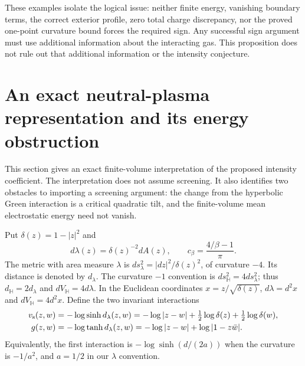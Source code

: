 \documentclass[11pt,a4paper]{article}
\numberwithin{equation}{section}
\theoremstyle{definition}
\theoremstyle{remark}
\begin{document}
These examples isolate the logical issue: neither finite energy,
vanishing boundary terms, the correct exterior profile, zero total
charge discrepancy, nor the proved one-point curvature bound forces
the required sign.  Any successful sign argument must use additional
information about the interacting gas.  This proposition does not
rule out that additional information or the intensity conjecture.


\section{An exact neutral-plasma representation and its energy obstruction}
\label{sec:neutral-ocp-screening}

This section gives an exact finite-volume interpretation of the proposed
intensity coefficient.  The interpretation does not assume screening.
It also identifies two obstacles to importing a screening argument: the
change from the hyperbolic Green interaction is a critical quadratic
tilt, and the finite-volume mean electrostatic energy need not vanish.

Put $\delta(z)=1-|z|^2$ and
\[
 d\lambda(z)=\delta(z)^{-2}dA(z),\qquad
 c_\beta=\frac{4/\beta-1}{\pi}.
\]
The metric with area measure $\lambda$ is
$ds_\lambda^2=|dz|^2/\delta(z)^2$, of curvature $-4$.
Its distance is denoted by $d_\lambda$.
The curvature $-1$ convention is $ds_{\mathbb H}^2=4ds_\lambda^2$;
thus $d_{\mathbb H}=2d_\lambda$ and $dV_{\mathbb H}=4d\lambda$.
In the Euclidean coordinates $x=z/\sqrt{\delta(z)}$,
$d\lambda=d^2x$ and $dV_{\mathbb H}=4d^2x$.
Define the two invariant interactions
\begin{align}
 v_{\rm s}(z,w)
 &=-\log\sinh d_\lambda(z,w)
 =-\log|z-w|+\tfrac12\log\delta(z)
                    +\tfrac12\log\delta(w),
 \label{eq:neutral-sinh-potential}\\
 g(z,w)
 &=-\log\tanh d_\lambda(z,w)
 =-\log|z-w|+\log|1-z\bar w|.
 \label{eq:neutral-green-potential}
\end{align}
Equivalently, the first interaction is $-\log\sinh(d/(2a))$
when the curvature is $-1/a^2$, and $a=1/2$ in our $\lambda$
convention.
\end{document}
